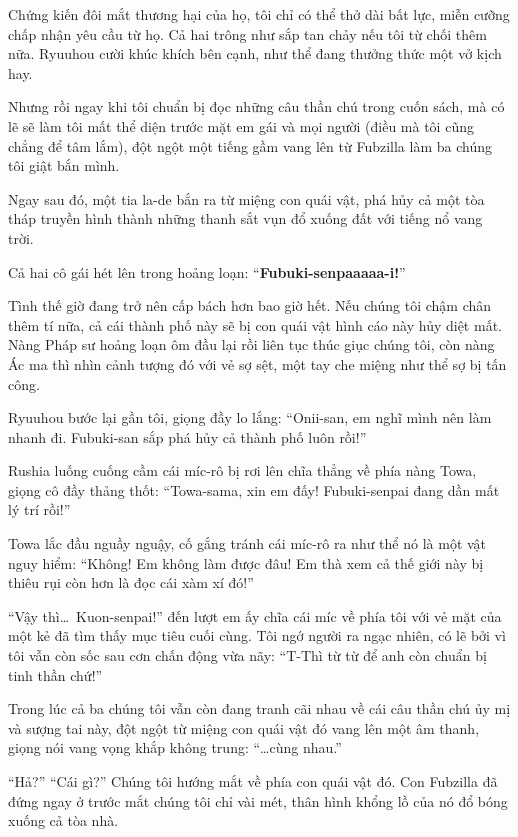 \documentclass[../main.tex]{subfiles}
\begin{document}
Chứng kiến đôi mắt thương hại của họ, tôi chỉ có thể thở dài bất lực, miễn cưỡng chấp nhận yêu cầu từ họ. Cả hai trông như sắp tan chảy nếu tôi từ chối thêm nữa. Ryuuhou cười khúc khích bên cạnh, như thể đang thưởng thức một vở kịch hay.

Nhưng rồi ngay khi tôi chuẩn bị đọc những câu thần chú trong cuốn sách, mà có lẽ sẽ làm tôi mất thể diện trước mặt em gái và mọi người (điều mà tôi cũng chẳng để tâm lắm), đột ngột một tiếng gầm vang lên từ Fubzilla làm ba chúng tôi giật bắn mình.

Ngay sau đó, một tia la-de bắn ra từ miệng con quái vật, phá hủy cả một tòa tháp truyền hình thành những thanh sắt vụn đổ xuống đất với tiếng nổ vang trời.


Cả hai cô gái hét lên trong hoảng loạn: ``\textbf{Fubuki-senpaaaaa-i!}''

Tình thế giờ đang trở nên cấp bách hơn bao giờ hết. Nếu chúng tôi chậm chân thêm tí nữa, cả cái thành phố này sẽ bị con quái vật hình cáo này hủy diệt mất. Nàng Pháp sư hoảng loạn ôm đầu lại rồi liên tục thúc giục chúng tôi, còn nàng Ác ma thì nhìn cảnh tượng đó với vẻ sợ sệt, một tay che miệng như thể sợ bị tấn công.

Ryuuhou bước lại gần tôi, giọng đầy lo lắng: ``Onii-san, em nghĩ mình nên làm nhanh đi. Fubuki-san sắp phá hủy cả thành phố luôn rồi!''

Rushia luống cuống cầm cái míc-rô bị rơi lên chĩa thẳng về phía nàng Towa, giọng cô đầy thảng thốt: ``Towa-sama, xin em đấy! Fubuki-senpai đang dần mất lý trí rồi!''

Towa lắc đầu nguầy nguậy, cố gắng tránh cái míc-rô ra như thể nó là một vật nguy hiểm: ``Không! Em không làm được đâu! Em thà xem cả thế giới này bị thiêu rụi còn hơn là đọc cái xàm xí đó!''

``Vậy thì\dots\ Kuon-senpai!'' đến lượt em ấy chĩa cái míc về phía tôi với vẻ mặt của một kẻ đã tìm thấy mục tiêu cuối cùng. Tôi ngớ người ra ngạc nhiên, có lẽ bởi vì tôi vẫn còn sốc sau cơn chấn động vừa nãy: ``T-Thì từ từ để anh còn chuẩn bị tinh thần chứ!''

Trong lúc cả ba chúng tôi vẫn còn đang tranh cãi nhau về cái câu thần chú ủy mị và sượng tai này, đột ngột từ miệng con quái vật đó vang lên một âm thanh, giọng nói vang vọng khắp không trung: ``\dots cùng nhau.''

``Hả?'' ``Cái gì?'' Chúng tôi hướng mắt về phía con quái vật đó. Con Fubzilla đã đứng ngay ở trước mắt chúng tôi chỉ vài mét, thân hình khổng lồ của nó đổ bóng xuống cả tòa nhà.
\end{document}
